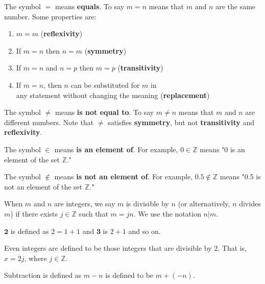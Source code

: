 The symbol $\boldsymbol{=}$ means \textbf{equals}. To say $m = n$ means that $m$ and $n$ are the same number. Some properties are:
\begin{enumerate}[label=\roman*.]
  \item $\mathit{m = m}$ \hfill (\textbf{reflexivity})
  \item If $m = n$ then $n = m$ \hfill (\textbf{symmetry})
  \item If $m = n$ and $n = p$ then $m = p$ \hfill (\textbf{transitivity})
  \item If $m = n$, then $n$ can be substituted for $m$ in \\ any statement without changing the meaning \hfill (\textbf{replacement})
\end{enumerate}


The symbol $\boldsymbol{\neq}$ means \textbf{is not equal to}. To say $m \neq n$ means that $m$ and $n$ are different numbers. Note that $\boldsymbol{\neq}$ satisfies \textbf{symmetry}, but not \textbf{transitivity} and \textbf{reflexivity}.


The symbol $\boldsymbol{\in}$ means \textbf{is an element of}. For example, $0 \in \mathbb{Z}$ means "0 is an element of the set $\mathbb{Z}$."

The symbol $\boldsymbol{\notin}$ means \textbf{is not an element of}. For example, $0.5 \notin \mathbb{Z}$ means "0.5 is not an element of the set $\mathbb{Z}$."

When $m$ and $n$ are integers, we say $m$ is divisible by $n$ (or alternatively, $n$ divides $m$) if there exists $j \in \mathbb{Z}$ such that $m = jn$. We use the notation $n|m$.

$\boldsymbol{2}$ is defined as $2 = 1+1$ and $\boldsymbol{3}$ is $2+1$ and so on.

Even integers are defined to be those integers that are divisible by $2$. That is, $x = 2j$, where $j \in \mathbb{Z}$.

Subtraction is defined as $m - n$ is defined to be $m + (-n)$.

